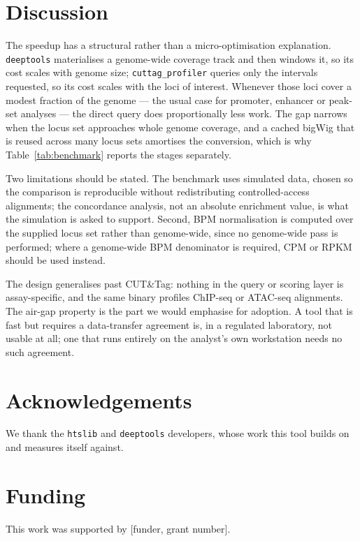 \documentclass[11pt,a4paper]{article}
\begin{document}
\section{Discussion}

The speedup has a structural rather than a micro-optimisation explanation.
\texttt{deeptools} materialises a genome-wide coverage track and then windows
it, so its cost scales with genome size; \texttt{cuttag\_profiler} queries only
the intervals requested, so its cost scales with the loci of interest. Whenever
those loci cover a modest fraction of the genome --- the usual case for
promoter, enhancer or peak-set analyses --- the direct query does
proportionally less work. The gap narrows when the locus set approaches whole
genome coverage, and a cached bigWig that is reused across many locus sets
amortises the conversion, which is why Table~\ref{tab:benchmark} reports the
stages separately.

Two limitations should be stated. The benchmark uses simulated data, chosen so
the comparison is reproducible without redistributing controlled-access
alignments; the concordance analysis, not an absolute enrichment value, is what
the simulation is asked to support. Second, BPM normalisation is computed over
the supplied locus set rather than genome-wide, since no genome-wide pass is
performed; where a genome-wide BPM denominator is required, CPM or RPKM should
be used instead.

The design generalises past CUT\&Tag: nothing in the query or scoring layer is
assay-specific, and the same binary profiles ChIP-seq or ATAC-seq alignments.
The air-gap property is the part we would emphasise for adoption. A tool that
is fast but requires a data-transfer agreement is, in a regulated laboratory,
not usable at all; one that runs entirely on the analyst's own workstation
needs no such agreement.

\section*{Acknowledgements}

We thank the \texttt{htslib} and \texttt{deeptools} developers, whose work this
tool builds on and measures itself against.

\section*{Funding}

This work was supported by [funder, grant number].
\end{document}
